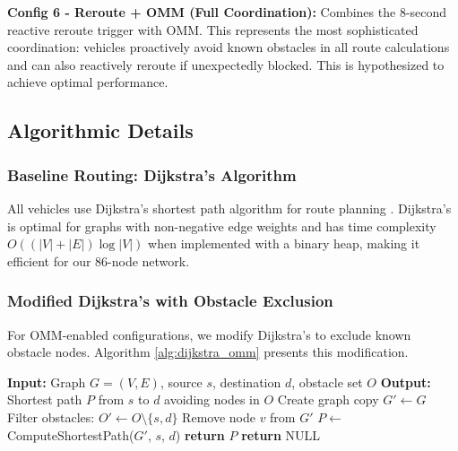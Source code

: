 \documentclass[conference]{IEEEtran}
\begin{document}
\textbf{Config 6 - Reroute + OMM (Full Coordination):} Combines the 8-second reactive reroute trigger with OMM. This represents the most sophisticated coordination: vehicles proactively avoid known obstacles in all route calculations and can also reactively reroute if unexpectedly blocked. This is hypothesized to achieve optimal performance.

\subsection{Algorithmic Details}

\subsubsection{Baseline Routing: Dijkstra's Algorithm}

All vehicles use Dijkstra's shortest path algorithm for route planning \cite{dijkstra2022note}. Dijkstra's is optimal for graphs with non-negative edge weights and has time complexity $O((|V| + |E|) \log |V|)$ when implemented with a binary heap, making it efficient for our 86-node network.

\subsubsection{Modified Dijkstra's with Obstacle Exclusion}

For OMM-enabled configurations, we modify Dijkstra's to exclude known obstacle nodes. Algorithm \ref{alg:dijkstra_omm} presents this modification.

\begin{algorithm}[t]
\caption{Modified Dijkstra's Algorithm with Obstacle Exclusion}
\label{alg:dijkstra_omm}
\begin{algorithmic}[1]
\STATE \textbf{Input:} Graph $G=(V,E)$, source $s$, destination $d$, obstacle set $O$
\STATE \textbf{Output:} Shortest path $P$ from $s$ to $d$ avoiding nodes in $O$
\STATE
\STATE Create graph copy $G' \leftarrow G$
\STATE Filter obstacles: $O' \leftarrow O \setminus \{s, d\}$ 
        \STATE Remove node $v$ from $G'$ 
    \ENDIF
\ENDFOR
\STATE
\STATE $P \leftarrow$ ComputeShortestPath($G'$, $s$, $d$) 
    \STATE \textbf{return} $P$
\ELSE
    \STATE \textbf{return} NULL 
\ENDIF
\end{algorithmic}
\end{algorithm}
\end{document}
